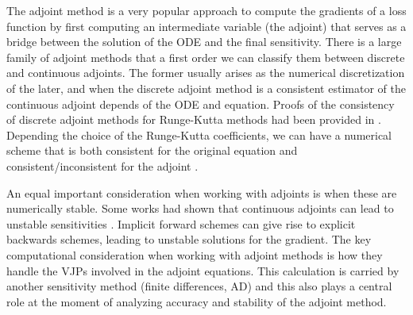 The adjoint method is a very popular approach to compute the gradients of a loss function by first computing an intermediate variable (the adjoint) that serves as a bridge between the solution of the ODE and the final sensitivity. 
There is a large family of adjoint methods that a first order we can classify them between discrete and continuous adjoints. 
The former usually arises as the numerical discretization of the later, and when the discrete adjoint method is a consistent estimator of the continuous adjoint depends of the ODE and equation.  
Proofs of the consistency of discrete adjoint methods for Runge-Kutta methods had been provided in \cite{sandu2006properties, sandu2011solution}.
Depending the choice of the Runge-Kutta coefficients, we can have a numerical scheme that is both consistent for the original equation and consistent/inconsistent for the adjoint \cite{Hager_2000}.

An equal important consideration when working with adjoints is when these are numerically stable. 
Some works had shown that continuous adjoints can lead to unstable sensitivities \cite{Jensen_Nakshatrala_Tortorelli_2014}.
Implicit forward schemes can give rise to explicit backwards schemes, leading to unstable solutions for the gradient. 
The key computational consideration when working with adjoint methods is how they handle the VJPs involved in the adjoint equations. 
This calculation is carried by another sensitivity method (finite differences, AD) and this also plays a central role at the moment of analyzing accuracy and stability of the adjoint method. 